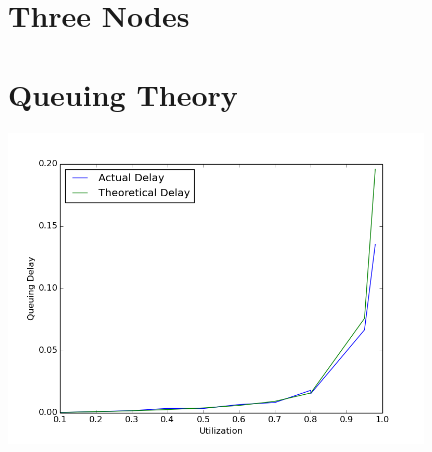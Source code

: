 \documentclass[11pt]{article}
\begin{document}
\section{Three Nodes}

\section{Queuing Theory}

\includegraphics[width=11cm]{test.png}
\end{document}

